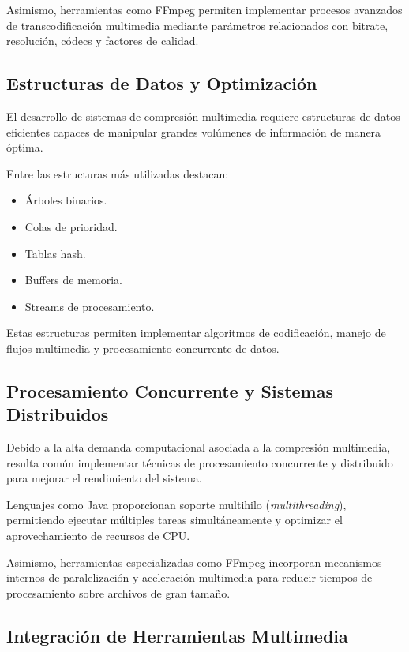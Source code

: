 \documentclass[12pt, oneside, letterpaper]{book}
\begin{document}
Asimismo, herramientas como FFmpeg permiten implementar procesos avanzados de transcodificación multimedia mediante parámetros relacionados con bitrate, resolución, códecs y factores de calidad.

\subsection{Estructuras de Datos y Optimización}

El desarrollo de sistemas de compresión multimedia requiere estructuras de datos eficientes capaces de manipular grandes volúmenes de información de manera óptima.

Entre las estructuras más utilizadas destacan:

\begin{itemize}

\item Árboles binarios.
\item Colas de prioridad.
\item Tablas hash.
\item Buffers de memoria.
\item Streams de procesamiento.
\end{itemize}

Estas estructuras permiten implementar algoritmos de codificación, manejo de flujos multimedia y procesamiento concurrente de datos.

\subsection{Procesamiento Concurrente y Sistemas Distribuidos}

Debido a la alta demanda computacional asociada a la compresión multimedia, resulta común implementar técnicas de procesamiento concurrente y distribuido para mejorar el rendimiento del sistema.

Lenguajes como Java proporcionan soporte multihilo (\textit{multithreading}), permitiendo ejecutar múltiples tareas simultáneamente y optimizar el aprovechamiento de recursos de CPU.

Asimismo, herramientas especializadas como FFmpeg incorporan mecanismos internos de paralelización y aceleración multimedia para reducir tiempos de procesamiento sobre archivos de gran tamaño.

\subsection{Integración de Herramientas Multimedia}
\end{document}
